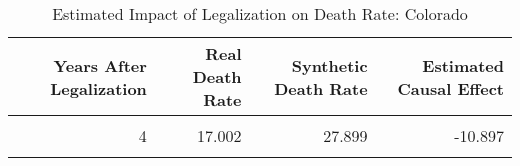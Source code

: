 \begin{table}[H]

\caption{\label{tab:causal_est_table_colorado}Estimated Impact of Legalization on Death Rate: Colorado}
\centering
\begin{tabular}[t]{rrrr}
\toprule
Years After Legalization & Real Death Rate & Synthetic Death Rate & Estimated Causal Effect\\
\midrule
\cellcolor{gray!6}{2} & \cellcolor{gray!6}{16.785} & \cellcolor{gray!6}{20.552} & \cellcolor{gray!6}{-3.767}\\
4 & 17.002 & 27.899 & -10.897\\
\cellcolor{gray!6}{6} & \cellcolor{gray!6}{17.470} & \cellcolor{gray!6}{28.002} & \cellcolor{gray!6}{-10.532}\\
\bottomrule
\end{tabular}
\end{table}
